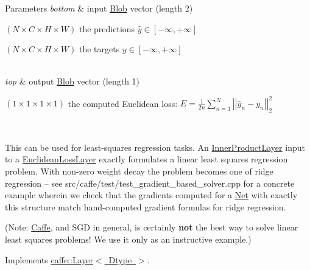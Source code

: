 \begin{DoxyParams}{Parameters}
{\em bottom} & input \mbox{\hyperlink{classcaffe_1_1_blob}{Blob}} vector (length 2)
\begin{DoxyEnumerate}
\item $ (N \times C \times H \times W) $ the predictions $ \hat{y} \in [-\infty, +\infty]$
\item $ (N \times C \times H \times W) $ the targets $ y \in [-\infty, +\infty]$ 
\end{DoxyEnumerate}\\
\hline
{\em top} & output \mbox{\hyperlink{classcaffe_1_1_blob}{Blob}} vector (length 1)
\begin{DoxyEnumerate}
\item $ (1 \times 1 \times 1 \times 1) $ the computed Euclidean loss\+: $ E = \frac{1}{2n} \sum\limits_{n=1}^N \left| \left| \hat{y}_n - y_n \right| \right|_2^2 $
\end{DoxyEnumerate}\\
\hline
\end{DoxyParams}
This can be used for least-\/squares regression tasks. An \mbox{\hyperlink{classcaffe_1_1_inner_product_layer}{Inner\+Product\+Layer}} input to a \mbox{\hyperlink{classcaffe_1_1_euclidean_loss_layer}{Euclidean\+Loss\+Layer}} exactly formulates a linear least squares regression problem. With non-\/zero weight decay the problem becomes one of ridge regression -- see src/caffe/test/test\+\_\+gradient\+\_\+based\+\_\+solver.\+cpp for a concrete example wherein we check that the gradients computed for a \mbox{\hyperlink{classcaffe_1_1_net}{Net}} with exactly this structure match hand-\/computed gradient formulas for ridge regression.

(Note\+: \mbox{\hyperlink{classcaffe_1_1_caffe}{Caffe}}, and S\+GD in general, is certainly {\bfseries not} the best way to solve linear least squares problems! We use it only as an instructive example.) 

Implements \mbox{\hyperlink{classcaffe_1_1_layer_a576ac6a60b1e99fe383831f52a6cea77}{caffe\+::\+Layer$<$ Dtype $>$}}.

\mbox{\label{classcaffe_1_1_weighted_euclidean_loss_layer_adbd3351b9d5de823aa6f222051bfacd7}} 
